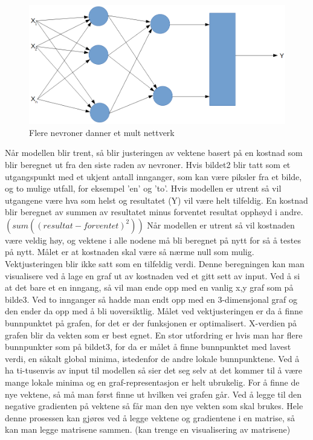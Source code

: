 \begin{figure}[ht]
    \centering
    \includegraphics[width=\textwidth]{images/neuron_multi.png}
    \caption{Flere nevroner danner et mult nettverk}
    \label{fig:nettverk}
\end{figure}

Når modellen blir trent, så blir justeringen av vektene basert på en kostnad som blir beregnet ut fra den siste raden av nevroner. Hvis bildet2 blir tatt som et utgangspunkt med et ukjent antall innganger, som kan være piksler fra et bilde, og to mulige utfall, for eksempel ’en’ og ’to’. Hvis modellen er utrent så vil utgangene være hva som helst og resultatet (Y) vil være helt tilfeldig. En kostnad  blir beregnet av summen av resultatet minus forventet resultat opphøyd i andre. $(sum((resultat-forventet)^2))$\newline
Når modellen er utrent så vil kostnaden være veldig høy, og vektene i alle nodene må bli beregnet på nytt for så å testes på nytt. Målet er at kostnaden skal være så nærme null som mulig.
Vektjusteringen blir ikke satt som en tilfeldig verdi. Denne beregningen kan man visualisere ved å lage en graf ut av kostnaden ved et gitt sett av input. Ved å si at det bare et en inngang, så vil man ende opp med en vanlig x,y graf som på bilde3. Ved to innganger så hadde man endt opp med en 3-dimensjonal graf og den ender da opp med å bli uoversiktlig. Målet ved vektjusteringen er da å finne bunnpunktet på grafen, for det er der funksjonen er optimalisert. X-verdien på grafen blir da vekten som er best egnet. \newline
En stor utfordring er hvis man har flere bunnpunkter som på bildet3, for da er målet å finne bunnpunktet med lavest verdi, en såkalt global minima, istedenfor de andre lokale bunnpunktene. Ved å ha ti-tusenvis av input til modellen så sier det seg selv at det kommer til å være mange lokale minima og en graf-representasjon er helt ubrukelig.\newline
For å finne de nye vektene, så må man først finne ut hvilken vei grafen går. Ved å legge til den negative gradienten på vektene så får man den nye vekten som skal brukes. Hele denne prosessen kan gjøres ved å legge vektene og gradientene i en matrise, så kan man legge matrisene sammen.  (kan trenge en visualisering av matrisene)\newline

